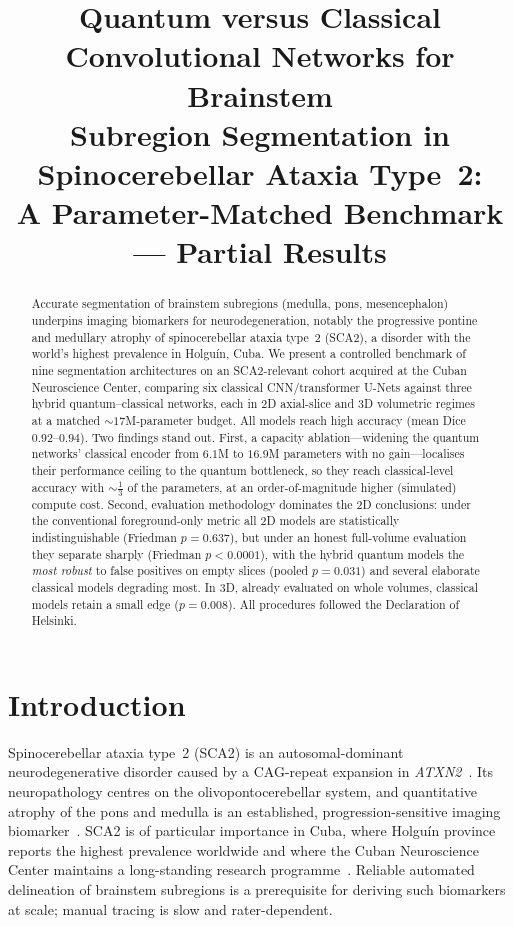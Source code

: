 \documentclass[runningheads]{llncs}
\title{Quantum versus Classical Convolutional Networks for Brainstem\\
Subregion Segmentation in Spinocerebellar Ataxia Type~2:\\
A Parameter-Matched Benchmark --- Partial Results}
\author{}
\institute{}
\begin{document}
\maketitle

\begin{abstract}
Accurate segmentation of brainstem subregions (medulla, pons, mesencephalon)
underpins imaging biomarkers for neurodegeneration, notably the progressive
pontine and medullary atrophy of spinocerebellar ataxia type~2 (SCA2), a
disorder with the world's highest prevalence in Holgu\'in, Cuba. We present a
controlled benchmark of nine segmentation architectures on an SCA2-relevant
cohort acquired at the Cuban Neuroscience Center, comparing six classical
CNN/transformer U-Nets against three hybrid quantum--classical networks, each
in 2D axial-slice and 3D volumetric regimes at a matched ${\sim}17$M-parameter
budget. All models reach high accuracy (mean Dice $0.92$--$0.94$). Two findings
stand out. First, a capacity ablation---widening the quantum networks'
classical encoder from $6.1$M to $16.9$M parameters with no gain---localises
their performance ceiling to the quantum bottleneck, so they reach
classical-level accuracy with ${\sim}\tfrac{1}{3}$ of the parameters, at an
order-of-magnitude higher (simulated) compute cost. Second, evaluation
methodology dominates the 2D conclusions: under the conventional
foreground-only metric all 2D models are statistically indistinguishable
(Friedman $p{=}0.637$), but under an honest full-volume evaluation they
separate sharply (Friedman $p{<}0.0001$), with the hybrid quantum models the
\emph{most robust} to false positives on empty slices (pooled
$p{=}0.031$) and several elaborate classical models degrading most. In 3D,
already evaluated on whole volumes, classical models retain a small edge
($p{=}0.008$). All procedures followed the Declaration of Helsinki.
\end{abstract}

\section{Introduction}
Spinocerebellar ataxia type~2 (SCA2) is an autosomal-dominant neurodegenerative
disorder caused by a CAG-repeat expansion in \emph{ATXN2}~\cite{pulst}. Its
neuropathology centres on the olivopontocerebellar system, and quantitative
atrophy of the pons and medulla is an established, progression-sensitive
imaging biomarker~\cite{velazquez}. SCA2 is of particular importance in Cuba,
where Holgu\'in province reports the highest prevalence worldwide and where the
Cuban Neuroscience Center maintains a long-standing research
programme~\cite{velazquez}. Reliable automated delineation of brainstem
subregions is a prerequisite for deriving such biomarkers at scale; manual
tracing is slow and rater-dependent.
\end{document}
